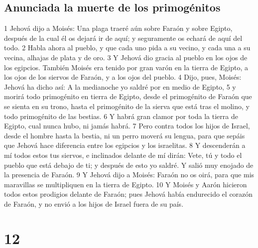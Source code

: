 \section*{Anunciada la muerte de los primogénitos}
1 Jehová dijo a Moisés: Una plaga traeré aún sobre Faraón y sobre Egipto, después de la cual él os dejará ir de aquí; y seguramente os echará de aquí del todo.
2 Habla ahora al pueblo, y que cada uno pida a su vecino, y cada una a su vecina, alhajas de plata y de oro.
3 Y Jehová dio gracia al pueblo en los ojos de los egipcios. También Moisés era tenido por gran varón en la tierra de Egipto, a los ojos de los siervos de Faraón, y a los ojos del pueblo.
4 Dijo, pues, Moisés: Jehová ha dicho así: A la medianoche yo saldré por en medio de Egipto,
5 y morirá todo primogénito en tierra de Egipto, desde el primogénito de Faraón que se sienta en su trono, hasta el primogénito de la sierva que está tras el molino, y todo primogénito de las bestias.
6 Y habrá gran clamor por toda la tierra de Egipto, cual nunca hubo, ni jamás habrá.
7 Pero contra todos los hijos de Israel, desde el hombre hasta la bestia, ni un perro moverá su lengua, para que sepáis que Jehová hace diferencia entre los egipcios y los israelitas.
8 Y descenderán a mí todos estos tus siervos, e inclinados delante de mí dirán: Vete, tú y todo el pueblo que está debajo de ti; y después de esto yo saldré. Y salió muy enojado de la presencia de Faraón.
9 Y Jehová dijo a Moisés: Faraón no os oirá, para que mis maravillas se multipliquen en la tierra de Egipto.
10 Y Moisés y Aarón hicieron todos estos prodigios delante de Faraón; pues Jehová había endurecido el corazón de Faraón, y no envió a los hijos de Israel fuera de su país.

\chapter{12}

